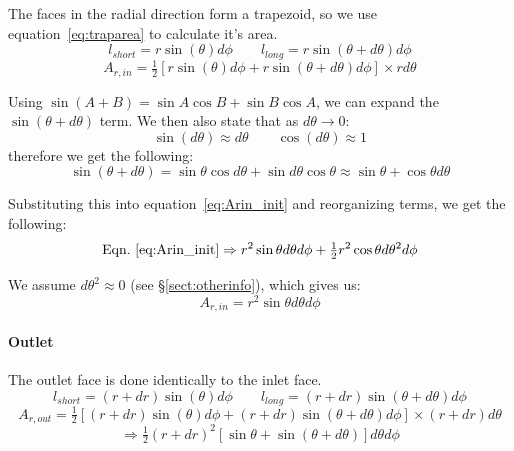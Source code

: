\documentclass[12pt, letterpaper, twoside]{article}
\begin{document}
            The faces in the radial direction form a trapezoid, so we use equation~\ref{eq:traparea} to calculate it's area.
            \begin{equation*}
                l_{short} = r\sin(\theta) d\phi  \qquad
                l_{long} = r\sin(\theta + d\theta) d\phi
            \end{equation*}
            \begin{equation}
                A_{r,in} = \tfrac{1}{2} [r\sin(\theta) d\phi + r\sin(\theta + d\theta) d\phi] \times rd\theta
                \label{eq:Arin_init}
            \end{equation}

            Using \(\sin(A+B) = \sin A \cos B + \sin B \cos A \), we can expand the \(\sin (\theta + d\theta)\) term. We then also state that as \(d\theta \rightarrow 0\):
            \begin{equation*}
                \sin (d\theta) \approx d\theta \qquad \cos(d\theta) \approx 1
            \end{equation*}
            therefore we get the following:
            \begin{equation*}
                \sin(\theta+d\theta) = 
                \sin\theta \cos d\theta + \sin d\theta \cos\theta \approx
                \sin\theta + \cos\theta d\theta
            \end{equation*}

            Substituting this into equation~\ref{eq:Arin_init} and reorganizing terms, we get the following:
            \begin{equation*}
                \text{Eqn.}\ \ref{eq:Arin_init} \Rightarrow
                r^2\sin\theta d\theta d\phi + \tfrac{1}{2}r^2\cos \theta d\theta^2 d\phi
            \end{equation*}

            We assume \(d\theta^2 \approx 0\) (see \S \ref{sect:otherinfo}), which gives us:
            \begin{equation}
                A_{r,in} = r^2 \sin\theta d\theta d\phi
                \label{eq:Arin_final}
            \end{equation}

        \paragraph{Outlet}
            The outlet face is done identically to the inlet face.
            \begin{equation*}
                l_{short} = (r + dr)\sin(\theta) d\phi  \qquad
                l_{long} = (r + dr)\sin(\theta + d\theta) d\phi
            \end{equation*}
            \begin{equation}
                A_{r,out} = \tfrac{1}{2} [(r + dr)\sin(\theta) d\phi + (r + dr)\sin(\theta + d\theta) d\phi] \times (r + dr)d\theta
                \label{eq:Arout_init}
            \end{equation}
            \begin{equation*}
                \Rightarrow
                \tfrac{1}{2} (r + dr)^2 [ \sin\theta + \sin (\theta + d\theta)] d\theta d\phi
            \end{equation*}
\end{document}
